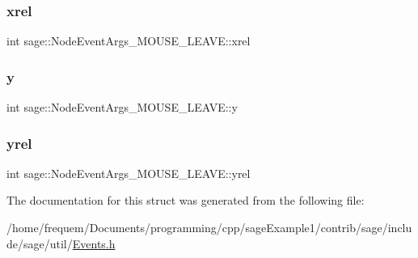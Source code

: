 \subsubsection{\texorpdfstring{xrel}{xrel}}
{\footnotesize\ttfamily int sage\+::\+Node\+Event\+Args\+\_\+\+M\+O\+U\+S\+E\+\_\+\+L\+E\+A\+V\+E\+::xrel}

\mbox{\label{structsage_1_1NodeEventArgs__MOUSE__LEAVE_a82964c48dc5ff5bc056acc519063631d}} 
\subsubsection{\texorpdfstring{y}{y}}
{\footnotesize\ttfamily int sage\+::\+Node\+Event\+Args\+\_\+\+M\+O\+U\+S\+E\+\_\+\+L\+E\+A\+V\+E\+::y}

\mbox{\label{structsage_1_1NodeEventArgs__MOUSE__LEAVE_a45b0fb3084854a12e889836e10c9ffd6}} 
\subsubsection{\texorpdfstring{yrel}{yrel}}
{\footnotesize\ttfamily int sage\+::\+Node\+Event\+Args\+\_\+\+M\+O\+U\+S\+E\+\_\+\+L\+E\+A\+V\+E\+::yrel}



The documentation for this struct was generated from the following file\+:\begin{DoxyCompactItemize}
\item 
/home/frequem/\+Documents/programming/cpp/sage\+Example1/contrib/sage/include/sage/util/\mbox{\hyperlink{Events_8h}{Events.\+h}}\end{DoxyCompactItemize}

